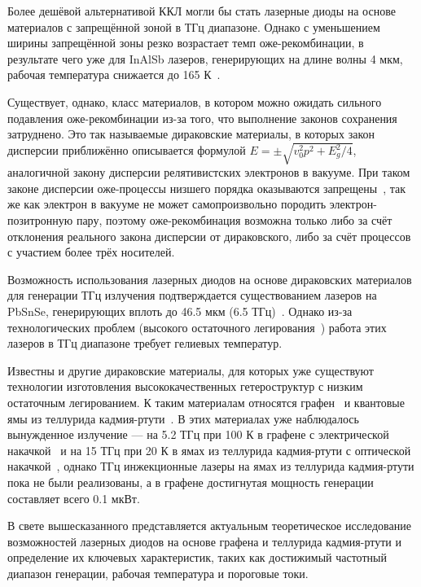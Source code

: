 Более дешёвой альтернативой ККЛ могли бы стать лазерные диоды на основе материалов с запрещённой зоной в ТГц диапазоне. Однако с уменьшением ширины запрещённой зоны резко возрастает темп оже-рекомбинации, в результате чего уже для InAlSb лазеров, генерирующих на длине волны 4 мкм, рабочая температура снижается до 165 К~\cite{InAlSb_low_operating_temperature}.

Существует, однако, класс материалов, в котором можно ожидать сильного подавления оже-рекомбинации из-за того, что выполнение законов сохранения затруднено. Это так называемые дираковские материалы, в которых закон дисперсии приближённо описывается формулой $E = \pm\sqrt{v_0^2 p^2 + E_g^2/4}$, аналогичной закону дисперсии релятивистских электронов в вакууме. При таком законе дисперсии оже-процессы низшего порядка оказываются запрещены~\cite{impossibility_of_Auger_in_Dirac_materials}, так же как электрон в вакууме не может самопроизвольно породить электрон-позитронную пару, поэтому оже-рекомбинация возможна только либо за счёт отклонения реального закона дисперсии от дираковского, либо за счёт процессов с участием более трёх носителей.

Возможность использования лазерных диодов на основе дираковских материалов для генерации ТГц излучения подтверждается существованием лазеров на PbSnSe, генерирующих вплоть до 46.5 мкм (6.5 ТГц)~\cite{lead_salt_record_wavelength}. Однако из-за технологических проблем (высокого остаточного легирования~\cite{lead_salt_problems}) работа этих лазеров в ТГц диапазоне требует гелиевых температур.

Известны и другие дираковские материалы, для которых уже существуют технологии изготовления высококачественных гетероструктур с низким остаточным легированием. К таким материалам относятся графен~\cite{high-quality_graphene} и квантовые ямы из теллурида кадмия-ртути~\cite{HgCdTe-technology}. В этих материалах уже наблюдалось вынужденное излучение --- на 5.2 ТГц при 100 К в графене с электрической накачкой~\cite{graphene_lasing} и на 15 ТГц при 20 К в ямах из теллурида кадмия-ртути с оптической накачкой~\cite{HgCdTe-stimulated_emission}, однако ТГц инжекционные лазеры на ямах из теллурида кадмия-ртути пока не были реализованы, а в графене достигнутая мощность генерации составляет всего 0.1 мкВт.

В свете вышесказанного представляется актуальным теоретическое исследование возможностей лазерных диодов на основе графена и теллурида кадмия-ртути и определение их ключевых характеристик, таких как достижимый частотный диапазон генерации, рабочая температура и пороговые токи.

